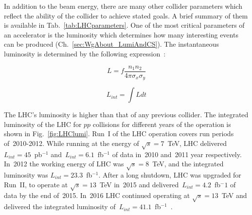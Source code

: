 

In addition to the beam energy, there are many other collider parameters which reflect the ability of the collider to achieve stated goals. A brief summary of them is available in Tab.~\ref{tab:LHCparameters}. One of the most critical parameters of an accelerator is the luminosity which determines how many interesting events can be produced (Ch.~\ref{sec:WgAbout_LumiAndCS}). The instantaneous luminosity is determined by the following expression~\cite{ref_PDG}:

\begin{equation}
L = f \frac{n_1 n_2}{4 \pi \sigma_x \sigma_y}
\end{equation}


\begin{equation}\label{eq:integratedL}
  L_{int}=\int L dt
\end{equation}


The LHC's luminosity is higher than that of any previous collider. The integrated luminosity of the LHC for $pp$ collisions for different years of the operation is shown in Fig.~\ref{fig:LHClumi}. Run~I of the LHC operation covers run periods of~2010-2012. While running at the energy of $\sqrt{s}=7$~TeV, LHC delivered~$L_{int}=45$~pb$^{-1}$ and~$L_{int}=6.1$~fb$^{-1}$ of data in~2010 and~2011 year respectively. In~2012 the working energy of LHC was $\sqrt{s}=8$~TeV, and the integrated luminosity was $L_{int}=23.3$~fb$^{-1}$.  After a long shutdown, LHC was upgraded for Run~II, to operate at $\sqrt{s}=13$~TeV in~2015 and delivered~$L_{int}=4.2$~fb$^-1$ of data by the end of~2015. In~2016 LHC continued operating at $\sqrt{s}=13$~TeV and delivered the integrated luminosity of~$L_{int}=41.1$~fb$^{-1}$~\cite{ref_LHClumi_twiki}.

